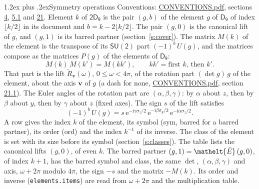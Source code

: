 \documentclass[10pt,a4paper]{article}
\makeatletter
\renewcommand\section{\@startsection{section}{1}{\z@}{-3ex plus -1ex minus -.2ex}%
  {1.2ex plus .2ex}{\normalfont\large\sffamily\bfseries\color{parttitle}}}
\numberwithin{equation}{section}
\newcommand{\eltfont}[1]{{\let\sigma\eltsigma\mathelt{#1}}}
\newcommand{\grp}[1]{\mathsf{#1}}
\newcommand{\elt}[1]{\eltfont{#1}}
\newcommand{\vv}{\mathbf{v}}
\newcommand{\iunit}{\mathrm{i}}
\newcommand{\expe}{\mathrm{e}}
\newcommand{\barred}[1]{\bar{#1}}
\newcommand{\lift}[1]{\tilde{#1}}
\newcommand{\pauli}[1]{\sigma_{#1}}
\makeatother
\begin{document}
\section{Symmetry operations}\label{s:elements}
Conventions: \href{../../CONVENTIONS.pdf}{CONVENTIONS.pdf}, sections \href{../../../rotation/CONVENTIONS.pdf\#conv.4}{4}, \href{../../../rotation/CONVENTIONS.pdf\#conv.5.1}{5.1} and \href{../../CONVENTIONS.pdf\#conv.21}{21}.
\leavevmode\label{n:index.element}\label{n:element.g}Element $k$ of $\grp{2D_{9}}$ is the pair $(g, b)$ of the element $g$ of \href{../../../rotation/data/pdf/D9.pdf}{$\grp{D_{9}}$} of index $\lfloor k/2\rfloor$ in its document and $b = k - 2\lfloor k/2\rfloor$. The pair $(g, 0)$ is the canonical lift of $g$, and $(g, 1)$ is its barred partner (section~\ref{s:cover}). \label{n:matrix.element.pin}\label{n:matrix.element}The matrix $M(k)$ of the element is the transpose of its $\grp{SU(2)}$ part $(-1)^{b}\,U(g)$, and the matrices compose as the matrices $P(g)$ of the elements of $\grp{D_{9}}$:
\begin{equation}\label{e:mprod}M(k)\,M(k') = M(kk'),\qquad kk' = \text{first } k\text{, then } k'.\end{equation}
\leavevmode\label{n:angle.omega}\label{n:vector.axis}\label{n:vector.pole}That part is the lift $\lift{R}_{\vv}(\omega)$, $0 \le \omega < 4\pi$, of the rotation part $(\det g)\,g$ of the element, about the axis $\vv$ of $g$ (a dash for none, \href{../../CONVENTIONS.pdf}{CONVENTIONS.pdf}, section \href{../../CONVENTIONS.pdf\#conv.21.1}{21.1}). \label{n:angle.euler.alpha}\label{n:angle.euler.beta}\label{n:angle.euler.gamma}\label{n:vector.coordinates}The Euler angles of the rotation part are $(\alpha,\beta,\gamma)$: by $\alpha$ about $z$, then by $\beta$ about $y$, then by $\gamma$ about $z$ (fixed axes). \label{n:local.euler.sign}The sign $s$ of the lift satisfies
\begin{equation}\label{e:euler}(-1)^{b}\,U(g) = s\,\expe^{-\iunit\gamma\pauli{z}/2}\,\expe^{-\iunit\beta\pauli{y}/2}\,\expe^{-\iunit\alpha\pauli{z}/2}.\end{equation}
\leavevmode\label{n:index.element.inverse}\label{n:head.sym}\label{n:head.ord}A row gives the index $k$ of the element, its symbol (sym, barred for a barred partner), its order (ord) and the index $k^{-1}$ of its inverse. \label{n:head.class}The class of the element is set with its size before its symbol (section~\ref{s:classes}).
The table lists the canonical lifts $(g, 0)$, of even $k$. The barred partner $(g, 1) = \elt{\barred{E}}\,(g, 0)$, of index $k + 1$, has the barred symbol and class, the same $\det$, $(\alpha,\beta,\gamma)$ and axis, $\omega + 2\pi$ modulo $4\pi$, the sign $-s$ and the matrix $-M(k)$. Its order and inverse (\texttt{elements.items}) are read from $\omega + 2\pi$ and the multiplication table.
\end{document}
